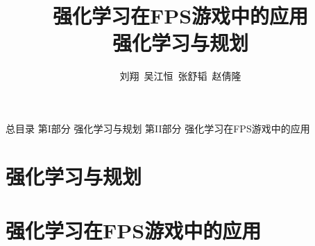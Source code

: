 \documentclass[10pt]{beamer}
\title[第四组报告]{强化学习在FPS游戏中的应用 \\ 强化学习与规划}
\author[张舒韬 et al.]{刘翔~吴江恒~张舒韬~赵倩隆}
\institute[SEU CS Dept. Team 4]{东南大学\ 计算机科学与工程学院\ 第4组}
\begin{document}
	{\background
		\begin{frame}
			\titlepage
		\end{frame}
	}

	\begin{frame}{总目录}
		第I部分 强化学习与规划
		\tableofcontents[part=1]
		第II部分 强化学习在FPS游戏中的应用
		\tableofcontents[part=2]
	\end{frame}

	\part{强化学习与规划}\label{part:rl-and-planning}
	
	\part{强化学习在FPS游戏中的应用}\label{part:rl-in-fps}
	
	{\background%
		\begin{frame}
		\end{frame}
	}
	
\end{document}
